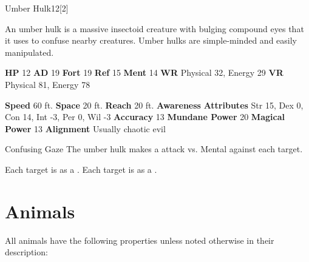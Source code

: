   \begin{monsection}{Umber Hulk}{12}[2]
    \vspace{-1em}\vspace{-1em}
    \vspace{0em}

    
    An umber hulk is a massive insectoid creature with bulging compound eyes that it uses to
    confuse nearby creatures. Umber hulks are simple-minded and easily manipulated.
  
    

    \begin{spellcontent}
      \begin{spelltargetinginfo}
        \pari \textbf{HP} 12 \monsep
          \textbf{AD} 19 \monsep
          \textbf{Fort} 19 \monsep
          \textbf{Ref} 15 \monsep
          \textbf{Ment} 14
        \pari \textbf{WR} Physical 32, Energy 29 \monsep
        \textbf{VR} Physical 81, Energy 78
        
      \end{spelltargetinginfo}
    \end{spellcontent}
    \begin{monsterfooter}
      \pari \textbf{Speed} 60 ft. \monsep
        \textbf{Space} 20 ft. \monsep
        \textbf{Reach} 20 ft.
      \pari \textbf{Awareness} 
      \pari \textbf{Attributes}
        Str 15, Dex 0,
        Con 14, Int -3,
        Per 0, Wil -3
      \pari \textbf{Accuracy} 13 \monsep
        \textbf{Mundane Power} 20 \monsep
      \textbf{Magical Power} 13
      \pari \textbf{Alignment} Usually chaotic evil
    \end{monsterfooter}
  \end{monsection}
  \begin{freeability}{Confusing Gaze}
       The umber hulk makes a  attack
        vs. Mental against each target.
    
    \hit Each target is  as a .
    \crit Each target is  as a .
    \end{freeability}
  
        \section{Animals}

        All animals have the following properties unless noted otherwise in their description:
        
